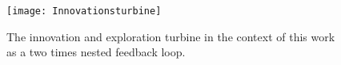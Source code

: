 \begin{figure}[h]
    \centering
    \texttt{[image: Innovationsturbine]}
    \caption{The innovation and exploration turbine in the context of this work as a two times nested feedback loop. \cite{adlakha-hutcheon_human_2022}}
    \label{fig:innovation_turbine}
\end{figure}



